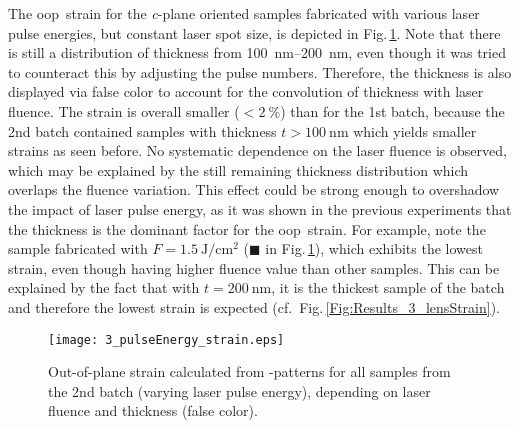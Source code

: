 The \gls{oop}\ strain for the \textit{c}-plane oriented samples fabricated with various laser pulse energies, but constant laser spot size, is depicted in Fig.\,\ref{Fig:Results_3_pulseStrain}.
Note that there is still a distribution of thickness from \qtyrange{100}{200}{\nm}, even though it was tried to counteract this by adjusting the pulse numbers.
Therefore, the thickness is also displayed via false color to account for the convolution of thickness with laser fluence.
The strain is overall smaller ($<\qty{2}{\percent}$) than for the 1st batch, because the 2nd batch contained samples with thickness $t>\qty{100}{\nm}$ which yields smaller strains as seen before.
No systematic dependence on the laser fluence is observed, which may be explained by the still remaining thickness distribution which overlaps the fluence variation.
This effect could be strong enough to overshadow the impact of laser pulse energy, as it was shown in the previous experiments that the thickness is the dominant factor for the \gls{oop}\ strain.
For example, note the sample fabricated with $F=\qty{1.5}{\J\per\cm\squared}$ (\textcolor{col-darkGreen}{$\blacksquare$} in Fig.\,\ref{Fig:Results_3_pulseStrain}), which exhibits the lowest strain, even though having higher fluence value than other samples.
This can be explained by the fact that with $t=\qty{200}{\nm}$, it is the thickest sample of the batch and therefore the lowest strain is expected (cf.\ Fig.\,\ref{Fig:Results_3_lensStrain}).
\begin{figure}
    \centering
    \texttt{[image: 3\_pulseEnergy\_strain.eps]}
    \caption{
        Out-of-plane strain calculated from \thetaomega-patterns for all samples from the 2nd batch (varying laser pulse energy), depending on laser fluence and thickness (false color).
    }
    \label{Fig:Results_3_pulseStrain}
\end{figure}


